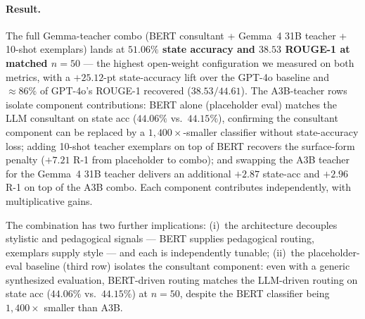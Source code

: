 \documentclass[11pt]{article}
\begin{document}
\paragraph{Result.} The full Gemma-teacher combo (BERT consultant + Gemma~4 31B teacher + 10-shot exemplars) lands at \textbf{$51.06\%$ state accuracy and $38.53$ ROUGE-1 at matched $n{=}50$} --- the highest open-weight configuration we measured on both metrics, with a $+25.12$-pt state-accuracy lift over the GPT-4o baseline and $\approx 86\%$ of GPT-4o's ROUGE-1 recovered ($38.53 / 44.61$). The A3B-teacher rows isolate component contributions: BERT alone (placeholder eval) matches the LLM consultant on state acc ($44.06\%$ vs.\ $44.15\%$), confirming the consultant component can be replaced by a $1{,}400{\times}$-smaller classifier without state-accuracy loss; adding 10-shot teacher exemplars on top of BERT recovers the surface-form penalty ($+7.21$ R-1 from placeholder to combo); and swapping the A3B teacher for the Gemma~4 31B teacher delivers an additional $+2.87$ state-acc and $+2.96$ R-1 on top of the A3B combo. Each component contributes independently, with multiplicative gains.

The combination has two further implications: (i)~the architecture decouples stylistic and pedagogical signals --- BERT supplies pedagogical routing, exemplars supply style --- and each is independently tunable; (ii)~the placeholder-eval baseline (third row) isolates the consultant component: even with a generic synthesized evaluation, BERT-driven routing matches the LLM-driven routing on state acc ($44.06\%$ vs.\ $44.15\%$) at $n{=}50$, despite the BERT classifier being $1{,}400{\times}$ smaller than A3B.
\end{document}
